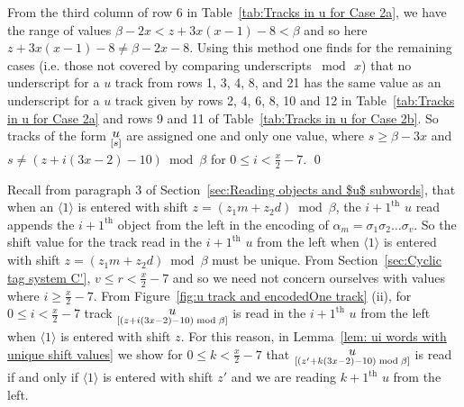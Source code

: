 \documentclass[11pt]{article} \usepackage{amsfonts,amsmath,amssymb,amsthm}
\renewenvironment{proof}{{\bfseries\noindent Proof.}}{\qed\vspace{3.5ex}}
\newcommand{\tne}[1]{\ensuremath{\langle #1\rangle}}
\newcommand{\encodeOne}{\tne{1}}
\newcommand{\track}[2]{\raisebox{2.5pt}{\ensuremath{\underset{[#1]}#2}}}
\begin{document}
\begin{proof}
From the third column of row 6 in Table~\ref{tab:Tracks in u for Case 2a}, we have the range of values $\beta-2x< z+3x(x-1)-8<\beta$ and so here $z+3x(x-1)-8\neq \beta-2x-8$.
Using this method one finds for the remaining cases (i.e. those not covered by comparing underscripts $\bmod\, x$) that no underscript for a $u$ track from rows 1, 3, 4, 8, and 21 has the same value as an underscript for a $u$ track given by rows 2, 4, 6, 8, 10 and 12 in Table~\ref{tab:Tracks in u for Case 2a} and rows 9 and 11 of Table~\ref{tab:Tracks in u for Case 2b}.
So tracks of the form $\track{s}{u}$ are assigned one and only one value, where $s\geqslant\beta-3x$ and $s\neq (z+i(3x-2)-10)\bmod \beta$ for $0\leqslant i< \frac{x}{2}-7$.
\end{proof}


Recall from paragraph 3 of Section~\ref{sec:Reading objects and $u$ subwords}, that when an $\encodeOne$ is entered with shift $z=(z_1m+z_2d)\bmod\beta$, the $i+1^{\textrm{th}}$ $u$ read appends the $i+1^{\textrm{th}}$ object from the left in the encoding of $\alpha_m=\sigma_1\sigma_2\ldots\sigma_v$. 
So the shift value for the track read in the $i+1^{\textrm{th}}$ $u$ from the left when $\encodeOne$ is entered with shift $z=(z_1m+z_2d)\bmod\beta$ must be unique.
From Section~\ref{sec:Cyclic tag system C'}, $v\leqslant r<\frac{x}{2}-7$ and so we need not concern ourselves with values where $i\geqslant\frac{x}{2}-7$. 
From Figure~\ref{fig:u track and encodedOne track} (ii), for $0\leqslant i<\frac{x}{2}-7$ track $\track{(z+i(3x-2)-10)\bmod\beta}{u}$ is read in the $i+1^{\textrm{th}}$ $u$ from the left when $\encodeOne$ is entered with shift $z$. 
For this reason, in Lemma~\ref{lem: ui words with unique shift values} we show for $0\leqslant k<\frac{x}{2}-7$ that $\track{(z'+k(3x-2)-10)\bmod\beta}{u}$ is read if and only if $\encodeOne$ is entered with shift $z'$ and we are reading $k+1^{\textrm{th}}$ $u$ from the left.
\end{document}

